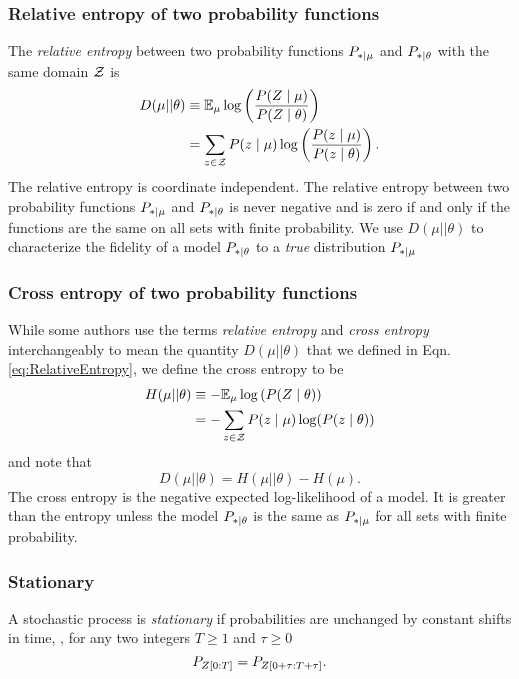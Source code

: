 \subsubsection{Relative entropy of two probability functions}
 The \emph{relative entropy} between two
probability functions $P_{*\mid \mu}$ and $P_{*\mid \theta}$ with the same
domain ${\cal Z}$ is %
\begin{align}
  \label{eq:RelativeEntropy}
  D(\mu||\theta) &\equiv \EV_{\mu} \log \left(
    \frac{P(Z\given \mu)}{P(Z\given \theta)} \right) \\
  &= \sum_{z \in \cal{Z}} P(z\given \mu) \log\left(
  \frac{P(z\given \mu)}{P(z\given \theta)} \right) \nonumber.
\end{align}
The relative entropy is coordinate independent.  The relative entropy
between two probability functions $P_{*\mid \mu}$ and $P_{*\mid \theta}$ is never
negative and is zero if and only if the functions are the same on all
sets with finite probability.  We use $D(\mu||\theta)$ to
characterize the fidelity of a model $P_{*\mid \theta}$ to a \emph{true}
distribution $P_{*\mid \mu}$

\subsubsection{Cross entropy of two probability functions}
While some authors use the terms \emph{relative entropy} and
\emph{cross entropy} interchangeably to mean the quantity
$D(\mu||\theta)$ that we defined in Eqn.\eqref{eq:RelativeEntropy}, we
define the cross entropy to be
\begin{align}
  \label{eq:CrossEntropy}
  H(\mu||\theta) &\equiv -\EV_{\mu} \log \left(P(Z\given \theta) \right) \\
  &= -\sum_{z \in \cal{Z}} P(z\given \mu) \log(P(z\given \theta)) \nonumber
\end{align}
and note that
\begin{equation*}
  D(\mu||\theta) = H(\mu||\theta) - H(\mu).
\end{equation*}
The cross entropy is the negative expected log-likelihood of a model.
It is greater than the entropy unless the model $P_{*\mid \theta}$ is the same
as $P_{*\mid \mu}$ for all sets with finite probability.

\subsubsection{Stationary}
A stochastic process is \emph{stationary} if probabilities are
unchanged by constant shifts in time, \ie, for any two integers
$T\geq 1$ and $\tau\geq 0$
\begin{equation*}
  P_{Z[0:T]} =  P_{Z[0+\tau:T+\tau]}.
\end{equation*}

